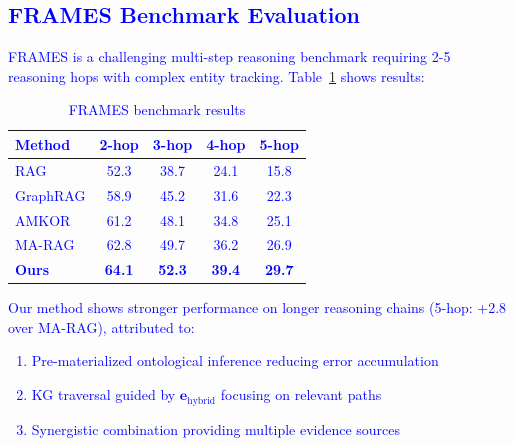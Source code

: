 \documentclass[10pt,twocolumn]{article}
\newcommand{\revision}[1]{\textcolor{blue}{#1}}
\begin{document}
\revision{
\subsection{FRAMES Benchmark Evaluation}
\label{sec:frames}

FRAMES \cite{krishna2024frames} is a challenging multi-step reasoning benchmark requiring 2-5 reasoning hops with complex entity tracking. Table~\ref{tab:frames} shows results:

\begin{table}[t]
\centering
\caption{FRAMES benchmark results}
\label{tab:frames}
\small
\begin{tabular}{@{}lcccc@{}}
\toprule
\textbf{Method} & \textbf{2-hop} & \textbf{3-hop} & \textbf{4-hop} & \textbf{5-hop} \\
\midrule
RAG & 52.3 & 38.7 & 24.1 & 15.8 \\
GraphRAG & 58.9 & 45.2 & 31.6 & 22.3 \\
AMKOR & 61.2 & 48.1 & 34.8 & 25.1 \\
MA-RAG & 62.8 & 49.7 & 36.2 & 26.9 \\
\midrule
\textbf{Ours} & \textbf{64.1} & \textbf{52.3} & \textbf{39.4} & \textbf{29.7} \\
\bottomrule
\end{tabular}
\end{table}

Our method shows stronger performance on longer reasoning chains (5-hop: +2.8 over MA-RAG), attributed to:
\begin{enumerate}
    \item Pre-materialized ontological inference reducing error accumulation
    \item KG traversal guided by $\mathbf{e}_{\text{hybrid}}$ focusing on relevant paths
    \item Synergistic combination providing multiple evidence sources
\end{enumerate}
}
\end{document}
